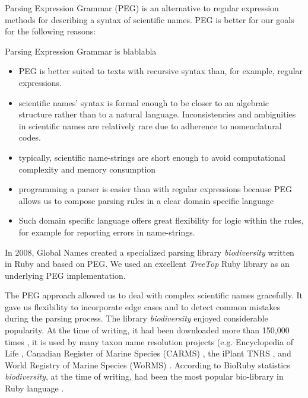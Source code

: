 \documentclass{bmcart}
\begin{document}
Parsing Expression Grammar (PEG) \cite{Ford2004} is an alternative to regular expression methods for describing a
syntax of scientific names. PEG is better for our goals for the
following reasons:

Parsing Expression Grammar is blablabla

\begin{itemize}

  \item PEG is better suited to texts with recursive syntax than, for example, regular expressions.

  \item scientific names' syntax is formal enough to be closer to an
    algebraic structure rather than to a natural language. Inconsistencies
    and ambiguities in scientific names are relatively rare due to adherence to
    nomenclatural codes.

  \item typically, scientific name-strings are short enough to avoid computational complexity and memory consumption

  \item programming a parser is easier than with regular
    expressions because PEG allows us to compose parsing rules in a clear domain
    specific language

  \item Such domain specific language offers great flexibility for logic within
    the rules, for example for reporting errors in name-strings.

\end{itemize}

In 2008, Global Names created a specialized parsing library \textit{biodiversity}
\cite{biodiversity} written in Ruby and based on PEG. We used an excellent
\textit{TreeTop} Ruby library \cite{treetop} as an underlying PEG
implementation.

The PEG approach allowed us to deal with complex scientific names
gracefully.  It gave us flexibility to incorporate edge cases and to detect common mistakes  during the parsing process. The library
\textit{biodiversity} enjoyed considerable popularity. At the time of writing, it
had been downloaded more than 150,000 times \cite{bdiv-downloads}, it is used
by many taxon name resolution projects (e.g. Encyclopedia of Life
\cite{eol}, Canadian Register of Marine Species (CARMS) \cite{carms}, the
iPlant TNRS \cite{iplant}, and World Registry of Marine Species (WoRMS)
\cite{worms}.  According to BioRuby statistics \textit{biodiversity}, at the
time of writing, had been the most popular bio-library in Ruby language
\cite{biogems}.
\end{document}
